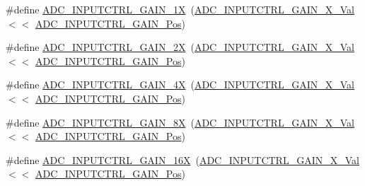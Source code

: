 \begin{DoxyCompactItemize}
\#define \mbox{\hyperlink{group___s_a_m_d21___a_d_c_ga6391976ada08ab18971da6ebff8998ff}{A\+D\+C\+\_\+\+I\+N\+P\+U\+T\+C\+T\+R\+L\+\_\+\+G\+A\+I\+N\+\_\+1X}}~(\mbox{\hyperlink{group___s_a_m_d21___a_d_c_gae498c391fa8ac63d38569d002826605a}{A\+D\+C\+\_\+\+I\+N\+P\+U\+T\+C\+T\+R\+L\+\_\+\+G\+A\+I\+N\+\_\+X\+\_\+\+Val}}     $<$$<$ \mbox{\hyperlink{group___s_a_m_d21___a_d_c_ga763ede70c37622db7cef7ce43bcabb0a}{A\+D\+C\+\_\+\+I\+N\+P\+U\+T\+C\+T\+R\+L\+\_\+\+G\+A\+I\+N\+\_\+\+Pos}})
\item 
\#define \mbox{\hyperlink{group___s_a_m_d21___a_d_c_gac318a99c761250489ed0a13f774e166d}{A\+D\+C\+\_\+\+I\+N\+P\+U\+T\+C\+T\+R\+L\+\_\+\+G\+A\+I\+N\+\_\+2X}}~(\mbox{\hyperlink{group___s_a_m_d21___a_d_c_gacc42108cc0e40f605bd1b3454c9508d4}{A\+D\+C\+\_\+\+I\+N\+P\+U\+T\+C\+T\+R\+L\+\_\+\+G\+A\+I\+N\+\_\+X\+\_\+\+Val}}     $<$$<$ \mbox{\hyperlink{group___s_a_m_d21___a_d_c_ga763ede70c37622db7cef7ce43bcabb0a}{A\+D\+C\+\_\+\+I\+N\+P\+U\+T\+C\+T\+R\+L\+\_\+\+G\+A\+I\+N\+\_\+\+Pos}})
\item 
\#define \mbox{\hyperlink{group___s_a_m_d21___a_d_c_ga811fa42115cf56ff780ca9fdc34d76c1}{A\+D\+C\+\_\+\+I\+N\+P\+U\+T\+C\+T\+R\+L\+\_\+\+G\+A\+I\+N\+\_\+4X}}~(\mbox{\hyperlink{group___s_a_m_d21___a_d_c_ga1f880c59128e102862d2e5d67a354be2}{A\+D\+C\+\_\+\+I\+N\+P\+U\+T\+C\+T\+R\+L\+\_\+\+G\+A\+I\+N\+\_\+X\+\_\+\+Val}}     $<$$<$ \mbox{\hyperlink{group___s_a_m_d21___a_d_c_ga763ede70c37622db7cef7ce43bcabb0a}{A\+D\+C\+\_\+\+I\+N\+P\+U\+T\+C\+T\+R\+L\+\_\+\+G\+A\+I\+N\+\_\+\+Pos}})
\item 
\#define \mbox{\hyperlink{group___s_a_m_d21___a_d_c_ga4f052c8955611e3212f760d96af9f3d6}{A\+D\+C\+\_\+\+I\+N\+P\+U\+T\+C\+T\+R\+L\+\_\+\+G\+A\+I\+N\+\_\+8X}}~(\mbox{\hyperlink{group___s_a_m_d21___a_d_c_ga947e4391fff8d438b3388a77858ad0ad}{A\+D\+C\+\_\+\+I\+N\+P\+U\+T\+C\+T\+R\+L\+\_\+\+G\+A\+I\+N\+\_\+X\+\_\+\+Val}}     $<$$<$ \mbox{\hyperlink{group___s_a_m_d21___a_d_c_ga763ede70c37622db7cef7ce43bcabb0a}{A\+D\+C\+\_\+\+I\+N\+P\+U\+T\+C\+T\+R\+L\+\_\+\+G\+A\+I\+N\+\_\+\+Pos}})
\item 
\#define \mbox{\hyperlink{group___s_a_m_d21___a_d_c_gab288a37bc839a3150ad20fdf71decdd1}{A\+D\+C\+\_\+\+I\+N\+P\+U\+T\+C\+T\+R\+L\+\_\+\+G\+A\+I\+N\+\_\+16X}}~(\mbox{\hyperlink{group___s_a_m_d21___a_d_c_gac1ed865d00b174a99fe28a0697de2dff}{A\+D\+C\+\_\+\+I\+N\+P\+U\+T\+C\+T\+R\+L\+\_\+\+G\+A\+I\+N\+\_\+X\+\_\+\+Val}}    $<$$<$ \mbox{\hyperlink{group___s_a_m_d21___a_d_c_ga763ede70c37622db7cef7ce43bcabb0a}{A\+D\+C\+\_\+\+I\+N\+P\+U\+T\+C\+T\+R\+L\+\_\+\+G\+A\+I\+N\+\_\+\+Pos}})
\item 
$$
\end{DoxyCompactItemize}
